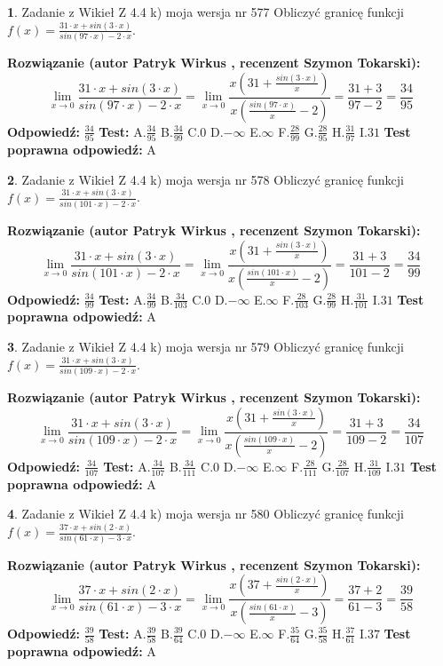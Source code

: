\documentclass[12pt, a4paper]{article}
\theoremstyle{definition} %
\newtheorem{zad}{}
\newcommand{\zadStart}[1]{\begin{zad}#1\newline}
\newcommand{\zadStop}{\end{zad}}
\newcommand{\rozwStart}[2]{\noindent \textbf{Rozwiązanie (autor #1 , recenzent #2): }\newline}
\newcommand{\rozwStop}{\newline}
\newcommand{\odpStart}{\noindent \textbf{Odpowiedź:}\newline}
\newcommand{\odpStop}{\newline}
\newcommand{\testStart}{\noindent \textbf{Test:}\newline}
\newcommand{\testStop}{\newline}
\newcommand{\kluczStart}{\noindent \textbf{Test poprawna odpowiedź:}\newline}
\newcommand{\kluczStop}{\newline}
\begin{document}
\zadStart{Zadanie z Wikieł Z 4.4 k) moja wersja nr 577}
Obliczyć granicę funkcji $f(x)=\frac{31\cdot x +sin(3\cdot x)}{sin(97\cdot x) -2\cdot x}$.
\zadStop
\rozwStart{Patryk Wirkus}{Szymon Tokarski}
$$\lim\limits_{x\to 0}\frac{31\cdot x +sin(3\cdot x)}{sin(97\cdot x) -2\cdot x}
=\lim\limits_{x\to 0}\frac{x(31+\frac{sin(3\cdot x)}{x})}{x(\frac{sin(97\cdot x)}{x}-2)}
=\frac{31+3}{97-2} = \frac{34}{95}$$
\rozwStop
\odpStart
$\frac{34}{95}$
\odpStop
\testStart
A.$\frac{34}{95}$
B.$\frac{34}{99}$
C.$0$
D.$-\infty$
E.$\infty$
F.$\frac{28}{99}$
G.$\frac{28}{95}$
H.$\frac{31}{97}$
I.$31$
\testStop
\kluczStart
A
\kluczStop



\zadStart{Zadanie z Wikieł Z 4.4 k) moja wersja nr 578}
Obliczyć granicę funkcji $f(x)=\frac{31\cdot x +sin(3\cdot x)}{sin(101\cdot x) -2\cdot x}$.
\zadStop
\rozwStart{Patryk Wirkus}{Szymon Tokarski}
$$\lim\limits_{x\to 0}\frac{31\cdot x +sin(3\cdot x)}{sin(101\cdot x) -2\cdot x}
=\lim\limits_{x\to 0}\frac{x(31+\frac{sin(3\cdot x)}{x})}{x(\frac{sin(101\cdot x)}{x}-2)}
=\frac{31+3}{101-2} = \frac{34}{99}$$
\rozwStop
\odpStart
$\frac{34}{99}$
\odpStop
\testStart
A.$\frac{34}{99}$
B.$\frac{34}{103}$
C.$0$
D.$-\infty$
E.$\infty$
F.$\frac{28}{103}$
G.$\frac{28}{99}$
H.$\frac{31}{101}$
I.$31$
\testStop
\kluczStart
A
\kluczStop



\zadStart{Zadanie z Wikieł Z 4.4 k) moja wersja nr 579}
Obliczyć granicę funkcji $f(x)=\frac{31\cdot x +sin(3\cdot x)}{sin(109\cdot x) -2\cdot x}$.
\zadStop
\rozwStart{Patryk Wirkus}{Szymon Tokarski}
$$\lim\limits_{x\to 0}\frac{31\cdot x +sin(3\cdot x)}{sin(109\cdot x) -2\cdot x}
=\lim\limits_{x\to 0}\frac{x(31+\frac{sin(3\cdot x)}{x})}{x(\frac{sin(109\cdot x)}{x}-2)}
=\frac{31+3}{109-2} = \frac{34}{107}$$
\rozwStop
\odpStart
$\frac{34}{107}$
\odpStop
\testStart
A.$\frac{34}{107}$
B.$\frac{34}{111}$
C.$0$
D.$-\infty$
E.$\infty$
F.$\frac{28}{111}$
G.$\frac{28}{107}$
H.$\frac{31}{109}$
I.$31$
\testStop
\kluczStart
A
\kluczStop



\zadStart{Zadanie z Wikieł Z 4.4 k) moja wersja nr 580}
Obliczyć granicę funkcji $f(x)=\frac{37\cdot x +sin(2\cdot x)}{sin(61\cdot x) -3\cdot x}$.
\zadStop
\rozwStart{Patryk Wirkus}{Szymon Tokarski}
$$\lim\limits_{x\to 0}\frac{37\cdot x +sin(2\cdot x)}{sin(61\cdot x) -3\cdot x}
=\lim\limits_{x\to 0}\frac{x(37+\frac{sin(2\cdot x)}{x})}{x(\frac{sin(61\cdot x)}{x}-3)}
=\frac{37+2}{61-3} = \frac{39}{58}$$
\rozwStop
\odpStart
$\frac{39}{58}$
\odpStop
\testStart
A.$\frac{39}{58}$
B.$\frac{39}{64}$
C.$0$
D.$-\infty$
E.$\infty$
F.$\frac{35}{64}$
G.$\frac{35}{58}$
H.$\frac{37}{61}$
I.$37$
\testStop
\kluczStart
A
\kluczStop
\end{document}
